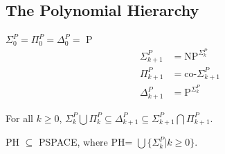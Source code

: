 \subsection{The Polynomial Hierarchy}

 $\Sigma^P_0 = \Pi^P_0 = \Delta^P_0 =$ P
\begin{align*}
  \Sigma^P_{k+1} & = \text{NP}^{\Sigma^P_{k}} \\
  \Pi^P_{k+1} &= \text{co-}\Sigma^P_{k+1} \\
  \Delta^P_{k+1} &= \text{P}^{\Sigma^P_{k}} 
\end{align*}

 For all $k \ge 0$, $\Sigma_k^P \bigcup \Pi_k^P \subseteq
\Delta_{k+1}^P \subseteq \Sigma_{k+1}^P \bigcap \Pi_{k+1}^P$.

 PH $\subseteq$ PSPACE, where PH= $\bigcup \{\Sigma^P_k|k \ge
0\}$.
